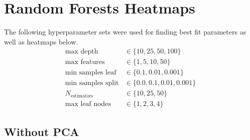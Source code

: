 \documentclass[a4paper]{article}
\begin{document}

\section{Random Forests Heatmaps} \label{app:rf_heatmaps}
The following hyperparameter sets were used for finding best fit parameters as well as heatmaps below.
\begin{align*}
	\text{max depth} &\in \{10, 25, 50, 100\}\\
	\text{max features} &\in \{1, 5, 10, 50\}\\
	\text{min samples leaf} &\in \{0.1, 0.01, 0.001\}\\
	\text{min samples split} &\in \{0.0, 0.1, 0.01, 0.001\}\\
	N_{\text{estimators}} &\in \{10, 25, 50\}\\
	\text{max leaf nodes} &\in \{1, 2, 3, 4\}
\end{align*}

\subsection{Without PCA}
\end{document}
